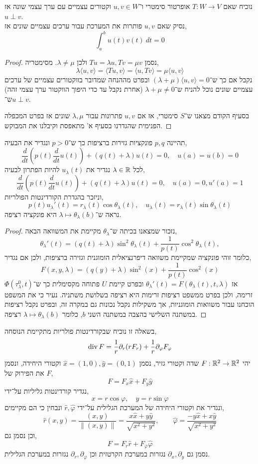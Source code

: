 \subquestion{}
נוכיח שאם $T : W \to V$ אופרטור סימטרי ו־$u, v \in W$ וקטורים עצמיים עם ערך עצמי שונה אז $u \perp v$. \\
נסיק שאם $u, v$ פותרות את המערכת עבור ערכים עצמיים שונים אז,
\[
	\int_{a}^{b} u(t) v(t)\ dt
	= 0
\]
\begin{proof}
	נסמן $T u = \lambda u, T v = \mu v$ ולכן $\lambda \ne \mu$.
	מסימטריה,
	\[
		\lambda \langle u, v \rangle
		= \langle T u, v \rangle
		= \langle u, T v \rangle
		= \mu \langle u, v \rangle
	\]
	נקבל אם כך ש־$(\lambda + \mu) \langle u, v \rangle = 0$ ובפרט מההנחה שמדובר בווקטורים עצמיים של ערכים עצמיים שונים נוכל להניח ש־$\lambda + \mu \ne 0$ (אחרת נקבל עד כדי היפוך הווקטור ערך עצמי זהה) ש־$u \perp v$.

	בסעיף הקודם מצאנו ש־$S$ סימטרי, אז אם $u, v$ פתרונות עבור $\lambda, \mu$ שונים אז בפרט המכפלה הפנימית שהגדרנו בסעיף א' מתאפסת וקיבלנו את המבוקש.
\end{proof}

\question{}
תהיינה $p, q$ פונקציות גזירות ברציפות כך ש־$p > 0$ ונגדיר את הבעיה,
\[
	\frac{d}{d t} (p(t) \frac{d}{d t} u(t)) + (q(t) + \lambda) u(t) = 0,
	\quad
	u(a) = u(b) = 0
\]
לכל $\lambda \in \mathbb{R}$ נגדיר את $u_{\lambda}(t)$ להיות הפתרון לבעיה,
\[
	\frac{d}{d t} (p(t) \frac{d}{d t} u(t)) + (q(t) + \lambda) u(t) = 0,
	\quad
	u(a) = 0,
	u'(a) = 1
\]
וניזכר בהגדרת הקורדינטות הפולריות,
\[
	p(t) u_{\lambda}'(t) = r_{\lambda}(t) \cos \theta_{\lambda}(t),
	\quad
	u_{\lambda}(t) = r_{\lambda}(t) \sin \theta_{\lambda}(t)
\]
נראה ש־$\lambda \mapsto \theta_{\lambda}(b)$ היא פונקציה רציפה.
\begin{proof}
	נזכור שמצאנו בכיתה ש־$\theta_{\lambda}$ מקיימת את המשוואה הבאה,
	\[
		\theta_{\lambda}'(t)
		= (q(t) + \lambda) \sin^2 \theta_{\lambda}(t) + \frac{1}{p(t)} \cos^2 \theta_{\lambda}(t),
	\]
	כלומר זוהי פונקציה שמקיימת משוואה דיפרנציאלית הומוגנית וגזירה ברציפות, ולכן אם נגדיר,
	\[
		F(x, y, \lambda)
		= (q(y) + \lambda) \sin^2(x) + \frac{1}{p(t)} \cos^2(x)
	\]
	אז $\theta_{\lambda}'(t) = F(\theta_{\lambda}(t), t, \lambda)$ ובפרט קיימת $U$ פתוחה מקסימלית כך ש־$\Phi(\tau_{\lambda}^0, t)$ זרימה, ולכן בפרט ממשפט רציפות זרימות היא רציפה בשלושת משתניה.
	נעיר כי את המשפט הוכחנו עבור משוואות הומוגניות, אך משקילות נקבל נכונות גם במקרה זה, ובפרט נקבל רציפות במשתנה השלישי בהצבה במשתנה השני $b$, כלומר $\lambda \mapsto \theta_{\lambda}(b)$ רציפה.
\end{proof}

\question{}
בשאלה זו נוכיח שבקורדינטות פולריות מתקיימת הנוסחה,
\[
	\operatorname{div} F
	= \frac{1}{r} \partial_r (r F_r) + \frac{1}{r} \partial_{\varphi} F_{\varphi}
\]
יהי $F : \mathbb{R}^2 \to \mathbb{R}^2$ שדה וקטורי גזיר, נסמן $\hat{x} = (1, 0), \hat{y} = (0, 1)$ וקטורי היחידה, ונסמן את הפירוק של $F$,
\[
	F = F_x \hat{x}  + F_y \hat{y}
\]
נגדיר קורדינטות גליליות על־ידי,
\[
	x = r \cos \varphi,
	\quad
	y = r \sin \varphi
\]
ונגדיר את וקטורי היחידה של המערכת הגלילית על־ידי $\hat{r}, \hat{\varphi}$ ונבחין כי הם מקיימים,
\[
	\hat{r}(x, y)
	= \frac{(x, y)}{\lVert (x, y) \rVert}
	= \frac{x \hat{x} + y \hat{y}}{\sqrt{x^2 + y^2}},
	\qquad
	\hat{\varphi} = \frac{-y \hat{x} + x \hat{y}}{\sqrt{x^2 + y^2}}
\]
וכן נסמן גם,
\[
	F = F_r \hat{r} + F_{\varphi} \hat{\varphi}
\]
נסמן גם $\partial_x, \partial_y$ נגזרות במערכת הקרטזית וכן $\partial_r, \partial_{\varphi}$ נגזרות במערכת הגלילית.

